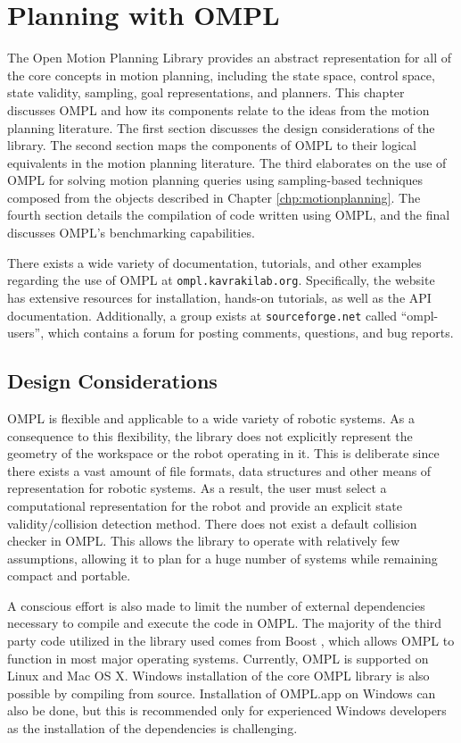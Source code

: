 \chapter {Planning with OMPL}
\label {chp:ompl}

The Open Motion Planning Library provides an abstract representation for all
of the core concepts in motion planning, including the state space, control space,
state validity, sampling, goal representations, and planners.  This chapter
discusses OMPL and how its components relate to the ideas from the motion
planning literature.  The first section discusses the design considerations of
the library.  The second section maps the components of OMPL to their logical
equivalents in the motion planning literature.  The third elaborates on the
use of OMPL for solving motion planning queries using sampling-based techniques
composed from the objects described in Chapter \ref{chp:motionplanning}.  The
fourth section details the compilation of code written using OMPL, and the final
discusses OMPL's benchmarking capabilities.

There exists a wide variety of documentation, tutorials, and other examples
regarding the use of OMPL at {\tt ompl.kavrakilab.org}.  Specifically, the
website has extensive resources for installation, hands-on tutorials, as well
as the API documentation.  Additionally, a group exists at {\tt sourceforge.net}
called ``ompl-users'', which contains a forum for posting comments, questions,
and bug reports.

\section {Design Considerations}
\label{chp:design}
OMPL is flexible and applicable to a wide variety of robotic systems.  As a
consequence to this flexibility, the library does not explicitly represent the
geometry of the workspace or the robot operating in it.  This is deliberate
since there exists a vast amount of file formats, data structures and other
means of representation for robotic systems.  As a result, the user must select
a computational representation for the robot and provide an explicit state
validity/collision detection method.  There does not exist a default collision
checker in OMPL.  This allows the library to operate with relatively few
assumptions, allowing it to plan for a huge number of systems while remaining
compact and portable.

A conscious effort is also made to limit the number of external dependencies
necessary to compile and execute the code in OMPL.  The majority of the third
party code utilized in the library used comes from Boost \cite{Boost}, which
allows OMPL to function in most major operating systems.  Currently, OMPL is
supported on Linux and Mac OS X.  Windows installation of the core OMPL
library is also possible by compiling from source.  Installation of OMPL.app on
Windows can also be done, but this is recommended only for experienced Windows
developers as the installation of the dependencies is challenging.

